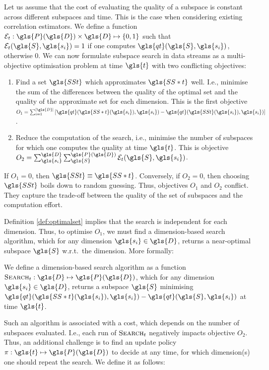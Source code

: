 Let us assume that the cost of evaluating the quality of a subspace is constant across different subspaces and time. This is the case when considering existing correlation estimators. We define a function $\mathcal{E}_t: \gls{P}(\gls{D}) \times \gls{D} \mapsto \{0,1\}$ such that $\mathcal{E}_t(\gls{S}, \gls{s_i}) = 1$ if one computes $\gls{qt}(\gls{S},\gls{s_i})$, otherwise $0$. We can now formulate subspace search in data streams as a multi-objective optimisation problem at time $\gls{t}$ with two conflicting objectives: %
\begin{enumerate}[noitemsep] 
	\item Find a set $\gls{SSt}$ which approximates $\gls{SS*t}$ well. 
	I.e., minimise the sum of the differences between the quality of the optimal set and the quality of the approximate set for each dimension. This is the first objective $O_1 = \sum_{i=1}^{|\gls{D}|} \left[\gls{qt}(\gls{SS*t}(\gls{s_i}),\gls{s_i}) - \gls{qt}(\gls{SSt}(\gls{s_i}),\gls{s_i})\right]$.
	\item Reduce the computation of the search, i.e., minimise the number of subspaces for which one computes the quality at time $\gls{t}$. This is objective $O_2 = \sum_{\gls{s_i}}^{\gls{D}} \sum_{\gls{S}}^{ \gls{P}(\gls{D})} \mathcal{E}_{t}(\gls{S}, \gls{s_i})$.
\end{enumerate}
If $O_1 = 0$, then $\gls{SSt} \equiv \gls{SS*t}$. Conversely, if $O_2 = 0$, then choosing $\gls{SSt}$ boils down to random guessing. Thus, objectives $O_1$ and $O_2$ conflict. They capture the trade-off between the quality of the set of subspaces and the computation effort. 

Definition \ref{def:optimalset} implies that the search is independent for each dimension. Thus, to optimise $O_1$, we must find a dimension-based search algorithm, which for any dimension $\gls{s_i} \in \gls{D}$, returns a near-optimal subspace $\gls{S}$ w.r.t.\ the dimension. More formally: 

\begin{definition}
	We define a dimension-based search algorithm as a function $\textsc{Search}_t: \gls{D} \mapsto \gls{P}(\gls{D})$, which for any dimension $\gls{s_i} \in \gls{D}$, returns a subspace $\gls{S}$ minimising  $\gls{qt}(\gls{SS*t}(\gls{s_i}),\gls{s_i}) - \gls{qt}(\gls{S},\gls{s_i})$ at time $\gls{t}$. 
\end{definition}

Such an algorithm is associated with a cost, which depends on the number of subspaces evaluated. I.e., each run of $\textsc{Search}_t$ negatively impacts objective $O_2$. Thus, an additional challenge is to find an update policy $\pi: \gls{t} \mapsto \gls{P}(\gls{D})$ to decide at any time, for which dimension(s) one should repeat the search. We define it as follows: 

